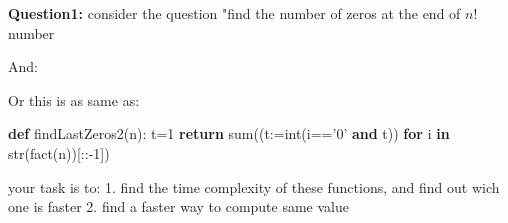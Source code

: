 \documentclass[11pt]{article}
\newenvironment{Shaded}{}{}
\newcommand{\KeywordTok}[1]{\textcolor[rgb]{0.00,0.44,0.13}{\textbf{{#1}}}}
\newcommand{\DecValTok}[1]{\textcolor[rgb]{0.25,0.63,0.44}{{#1}}}
\newcommand{\StringTok}[1]{\textcolor[rgb]{0.25,0.44,0.63}{{#1}}}
\newcommand{\NormalTok}[1]{{#1}}
\newcommand{\ControlFlowTok}[1]{\textcolor[rgb]{0.00,0.44,0.13}{\textbf{{#1}}}}
\newcommand{\OperatorTok}[1]{\textcolor[rgb]{0.40,0.40,0.40}{{#1}}}
\newcommand{\BuiltInTok}[1]{{#1}}
\begin{document}
\textbf{Question1:} consider the question "find the number of zeros at
the end of \(n!\) number

\begin{Shaded}
\end{Shaded}

And:

\begin{Shaded}
\end{Shaded}

Or this is as same as:

\begin{Shaded}
\begin{Highlighting}[]
\KeywordTok{def}\NormalTok{ findLastZeros2(n):}
\NormalTok{    t}\OperatorTok{=}\DecValTok{1}
    \ControlFlowTok{return} \BuiltInTok{sum}\NormalTok{((t:}\OperatorTok{=}\BuiltInTok{int}\NormalTok{(i}\OperatorTok{==}\StringTok{'0'} \KeywordTok{and}\NormalTok{ t)) }\ControlFlowTok{for}\NormalTok{ i }\KeywordTok{in} \BuiltInTok{str}\NormalTok{(fact(n))[::}\OperatorTok{-}\DecValTok{1}\NormalTok{])}
\end{Highlighting}
\end{Shaded}

your task is to: 1. find the time complexity of these functions, and
find out wich one is faster 2. find a faster way to compute same value
\end{document}
